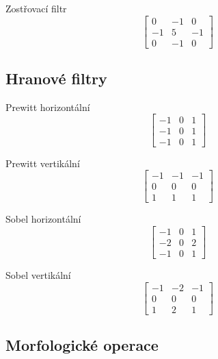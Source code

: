 Zostřovací filtr
\begin{equation}
    \begin{bmatrix}
        0 & -1 & 0 \\
        -1 & 5 & -1 \\
        0 & -1 & 0
    \end{bmatrix}
\end{equation}

\subsection{Hranové filtry}

Prewitt horizontální
\begin{equation}
    \begin{bmatrix}
        -1 & 0 & 1 \\
        -1 & 0 & 1 \\
        -1 & 0 & 1
    \end{bmatrix}
\end{equation}

Prewitt vertikální
\begin{equation}
    \begin{bmatrix}
        -1 & -1 & -1 \\
        0 & 0 & 0 \\
        1 & 1 & 1
    \end{bmatrix}
\end{equation}

Sobel horizontální
\begin{equation}
    \begin{bmatrix}
        -1 & 0 & 1 \\
        -2 & 0 & 2 \\
        -1 & 0 & 1
    \end{bmatrix}
\end{equation}

Sobel vertikální
\begin{equation}
    \begin{bmatrix}
        -1 & -2 & -1 \\
        0 & 0 & 0 \\
        1 & 2 & 1
    \end{bmatrix}
\end{equation}

\subsection{Morfologické operace}

